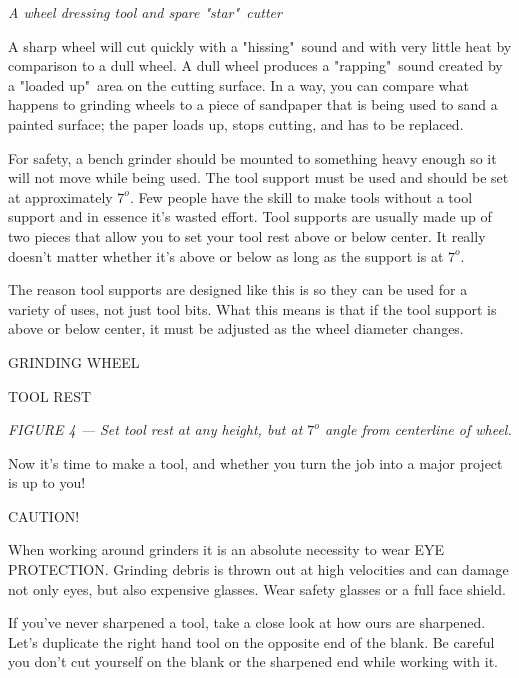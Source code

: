 \bigskip
\textit{A wheel dressing tool and spare "star"\ cutter}
\bigskip

A sharp wheel will cut quickly with a "hissing"\ sound and with very little heat
by comparison to a dull wheel. A dull wheel produces a "rapping"\ sound created
by a "loaded up"\ area on the cutting surface. In a way, you can compare what
happens to grinding wheels to a piece of sandpaper that is being used to sand a
painted surface; the paper loads up, stops cutting, and has to be replaced.


For safety, a bench grinder should be mounted to something heavy enough so it
will not move while being used. The tool support must be used and should be set
at approximately $7^{o}$. Few people have the skill to make tools without a tool
support and in essence it's wasted effort. Tool supports are usually made up of
two pieces that allow you to set your tool rest above or below center. It really
doesn't matter whether it's above or below as long as the support is at $7^{o}$.

The reason tool supports are designed like this is so they can be used for a
variety of uses, not just tool bits. What this means is that if the tool support
is above or below center, it must be adjusted as the wheel diameter changes.

\bigskip
GRINDING WHEEL

TOOL REST
\bigskip

\textit{FIGURE 4 — Set tool rest at any height, but at $7^{o}$ angle from centerline
of wheel.}
\bigskip


Now it's time to make a tool, and whether you turn the job into a major project
is up to you!

\begin{framed}
CAUTION!

When working around grinders it is an absolute necessity to wear EYE PROTECTION.
Grinding debris is thrown out at high velocities and can damage not only eyes,
but also expensive glasses. Wear safety glasses or a full face shield.
\end{framed}

If you've never sharpened a tool, take a close look at how ours are sharpened.
Let's duplicate the right hand tool on the opposite end of the blank. Be careful
you don't cut yourself on the blank or the sharpened end while working with it.

